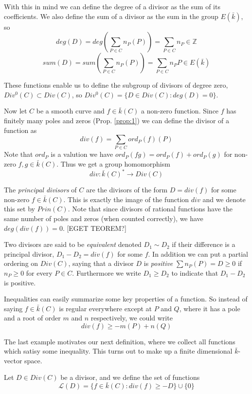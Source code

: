 With this in mind we can define the degree of a divisor as the sum of its 
coefficients. We also define the sum of a divisor as the sum in the group $E(\bar{k})$, so
$$ deg(D) = deg(\sum_{P\in C} n_P(P)) = \sum_{P\in C} n_P \in \mathbb{Z}$$
$$ sum(D) = sum(\sum_{P\in C} n_P(P)) = \sum_{P\in C} n_P P \in E(\bar{k})$$

These functions enable us to define the subgroup of divisors of degree zero,
$Div^0(C) \subset Div(C)$, so $Div^0(C) = \{ D\in Div(C) : deg(D) = 0 \}$.

Now let $C$ be a smooth curve and $f\in \bar{k}(C)$ a non-zero function. Since $f$
has finitely many poles and zeros (Prop. \ref{prop:1}) we can define the divisor of a
function as
$$ div(f) = \sum_{P\in C} ord_P(f)(P) $$
Note that $ord_P$ is a valution we have $ord_P(fg) = ord_P(f)+ord_P(g)$
for non-zero $f,g\in \bar{k}(C)$. Thus we get a group homomorphism
$$ div: \bar{k}(C)^* \rightarrow Div(C)$$

\begin{mydef}
 The \emph{principal divisors} of $C$ are the divisors of the form
$ D = div(f) $ for some non-zero $f\in \bar{k}(C)$. This is exactly
the image of the function $div$ and we denote this set by $Prin(C)$.
Note that since divisors of rational functions have the same number of poles
and zeros (when counted correctly), we have $deg(div(f)) = 0$. [EGET TEOREM?]
\end{mydef}

Two divisors are said to be \emph{equivalent} denoted $D_1 \sim D_2$ if
their difference is a principal divisor, $D_1 - D_2 = div(f)$ for some $f$. In
addition we can put a partial ordering on $Div(C)$, saying that a divisor $D$ is
\emph{positive} $\sum n_P(P)=D \geq 0$ if $n_P \geq 0$ for every $P\in C$. Furthermore
we write $D_1 \geq D_2$ to indicate that $D_1 - D_2$ is positive.

\begin{ex}
 Inequalities can easily summarize some key properties of a function. So instead of
saying $f \in \bar{k}(C)$ is regular everywhere except at $P$ and $Q$, where it has a
pole and a root of order $m$ and $n$ respectively, we could write
$$ div(f) \geq -m(P)+n(Q) $$
\end{ex}

The last example motivates our next definition, where we collect all functions
which satisy some inequality. This turns out to make up a finite dimensional
$\bar{k}$-vector space.

\begin{mydef}
 Let $D \in Div(C)$ be a divisor, and we define the set of functions
$$ \mathscr{L}(D) = \{ f\in \bar{k}(C) : div(f) \geq -D \} \cup \{ 0\} $$
\end{mydef}

